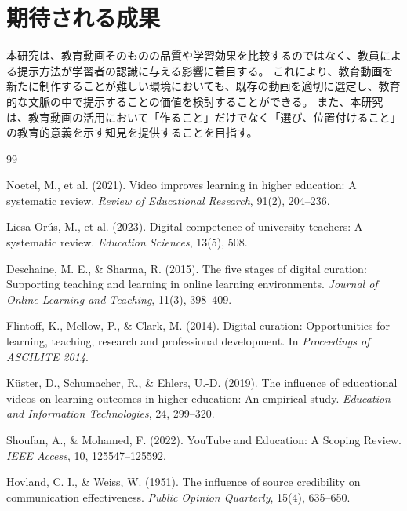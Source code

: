 \documentclass[a4paper,10pt]{ltjsarticle}
\begin{document}
\section{期待される成果}

本研究は、教育動画そのものの品質や学習効果を比較するのではなく、教員による提示方法が学習者の認識に与える影響に着目する。
これにより、教育動画を新たに制作することが難しい環境においても、既存の動画を適切に選定し、教育的な文脈の中で提示することの価値を検討することができる。
また、本研究は、教育動画の活用において「作ること」だけでなく「選び、位置付けること」の教育的意義を示す知見を提供することを目指す。


\begin{thebibliography}{99}

Noetel, M., et al. (2021).
Video improves learning in higher education: A systematic review.
\textit{Review of Educational Research}, 91(2), 204--236.

Liesa-Orús, M., et al. (2023).
Digital competence of university teachers: A systematic review.
\textit{Education Sciences}, 13(5), 508.

Deschaine, M. E., \& Sharma, R. (2015).
The five stages of digital curation: Supporting teaching and learning in online learning environments.
\textit{Journal of Online Learning and Teaching}, 11(3), 398--409.

Flintoff, K., Mellow, P., \& Clark, M. (2014).
Digital curation: Opportunities for learning, teaching, research and professional development.
In \textit{Proceedings of ASCILITE 2014}.

Küster, D., Schumacher, R., \& Ehlers, U.-D. (2019).
The influence of educational videos on learning outcomes in higher education: An empirical study.
\textit{Education and Information Technologies}, 24, 299--320.

Shoufan, A., \& Mohamed, F. (2022).
YouTube and Education: A Scoping Review.
\textit{IEEE Access}, 10, 125547--125592.

Hovland, C. I., \& Weiss, W. (1951).
The influence of source credibility on communication effectiveness.
\textit{Public Opinion Quarterly}, 15(4), 635--650.

\end{thebibliography}
\end{document}
